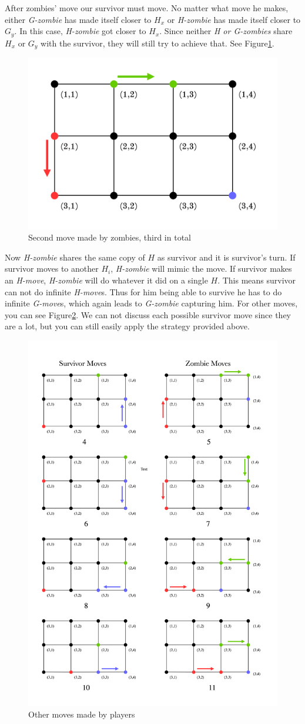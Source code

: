 \documentclass[1p]{elsarticle}
\begin{document}
After zombies' move our survivor must move. No matter what move he makes, either {\it G-zombie} has made itself closer
to $H_x$ or {\it H-zombie} has made itself closer to $G_y$. In this case, {\it H-zombie} got closer to  $H_x$. Since
neither {\it H or G-zombies}  share $H_x$ or $G_y$ with the survivor, they will still try to achieve that. See Figure\ref{fig:p5}.

\begin{figure}[h!]
	\centering
	\includegraphics[width=0.5\linewidth]{fig/p34m3.png}
	\caption{Second move made by zombies, third in total}
	\label{fig:p5}
\end{figure}

Now {\it H-zombie} shares the same copy of $H$ as survivor and it is survivor's turn. If survivor moves to another $H_i$,
{\it H-zombie} will mimic the move. If survivor makes an {\it H-move}, {\it H-zombie} will do whatever it did on a
single $H$. This means survivor can not do infinite {\it H-move}s. Thus for him being able to survive he has to do
infinite {\it G-move}s, which again leads to {\it G-zombie} capturing him. For other moves, you can see
Figure\ref{fig:p6}. We can not discuss each possible survivor move since they are a lot, but you can still easily apply
the strategy provided above. 

\begin{figure}[h!]
	\centering
	\includegraphics[width=0.6\linewidth]{fig/p34m6.png}
	\caption{Other moves made by players}
	\label{fig:p6}
\end{figure}

	
\end{document}
